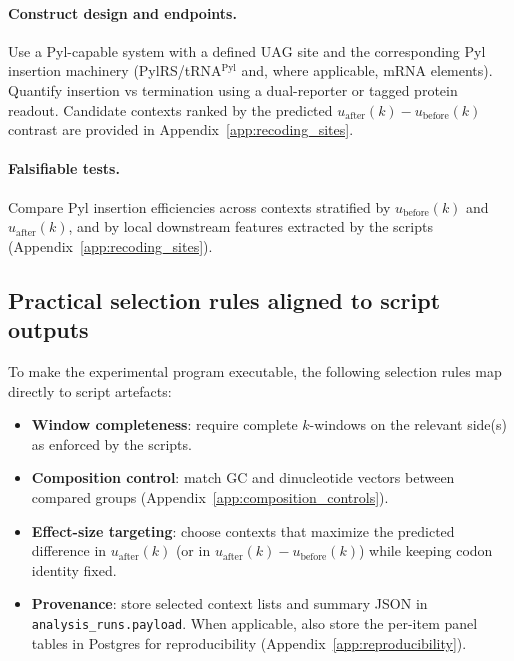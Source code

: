 \paragraph{Construct design and endpoints.}
Use a Pyl-capable system with a defined $\mathrm{UAG}$ site and the corresponding Pyl insertion machinery (PylRS/tRNA$^{\mathrm{Pyl}}$ and, where applicable, mRNA elements).
Quantify insertion vs termination using a dual-reporter or tagged protein readout.
Candidate contexts ranked by the predicted $u_{\mathrm{after}}(k)-u_{\mathrm{before}}(k)$ contrast are provided in Appendix~\ref{app:recoding_sites}.

\paragraph{Falsifiable tests.}
Compare Pyl insertion efficiencies across contexts stratified by $u_{\mathrm{before}}(k)$ and $u_{\mathrm{after}}(k)$, and by local downstream features extracted by the scripts (Appendix~\ref{app:recoding_sites}).

\subsection{Practical selection rules aligned to script outputs}
\label{app:bio_validation_selection_rules}

To make the experimental program executable, the following selection rules map directly to script artefacts:
\begin{itemize}
\item \textbf{Window completeness}: require complete $k$-windows on the relevant side(s) as enforced by the scripts.
\item \textbf{Composition control}: match GC and dinucleotide vectors between compared groups (Appendix~\ref{app:composition_controls}).
\item \textbf{Effect-size targeting}: choose contexts that maximize the predicted difference in $u_{\mathrm{after}}(k)$ (or in $u_{\mathrm{after}}(k)-u_{\mathrm{before}}(k)$) while keeping codon identity fixed.
\item \textbf{Provenance}: store selected context lists and summary JSON in \texttt{analysis\_runs}\allowbreak\texttt{.payload}. When applicable, also store the per-item panel tables in Postgres for reproducibility (Appendix~\ref{app:reproducibility}).
\end{itemize}


